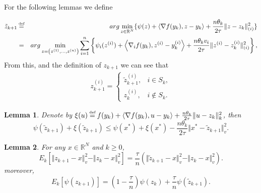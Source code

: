 \documentclass{article}
\newcommand\myeq{\stackrel{\mathclap{\normalfont\mbox{\tiny{def}}}}{=}}
\newcommand{\R}{\mathbb{R}}
\newcommand{\x}{x^*}
\newtheorem{lema}{Lemma}
\begin{document}
For the following lemmas we define

\begin{eqnarray*}
	\tilde{z}_{k+1} &\myeq & arg \min_{z \in \R^N} \lbrace \psi(z) + \left< \nabla f(y_k),z-y_k\right> + \frac{n\theta_k}{2\tau} \Vert z-z_k \Vert_{(i)}^2 \rbrace \\
	&=&arg\min_{z = \left(z^{(1)},\ldots,z^{(n)} \right)} \sum_{i=1}^n \left\lbrace \psi_i(z^{(i)}) + \left< \nabla_i f(y_k),z^{(i)}-y_k^{(i)} \right> + \frac{n\theta_k v_i}{2\tau} \Vert z^{(i)}-z_k^{(i)}\Vert_{(i)}^2 \right\rbrace,
\end{eqnarray*}
From this, and the definition of $z_{k+1}$ we can see that
\begin{align*}
	z_{k+1}^{(i)} = \begin{cases}
						\tilde{z}_{k+1}^{(i)}, &i \in S_k, \\
						z_k^{(i)}, &i \notin S_k. 
	\end{cases}
\end{align*}

\begin{lema}
Denote by $\xi(u) \myeq f(y_k) + \left< \nabla f(y_k),u-y_k \right> + \frac{n\theta_k}{2\tau}\Vert u-z_k \Vert^2_k$, then
	\begin{equation}
		\psi(\tilde{z}_{k+1}) + \xi(\tilde{z}_{k+1}) \leq \psi(\x)+\xi(\x)-\frac{n\theta_k}{2\tau} \Vert \x - \tilde{z}_{k+1} \Vert_v^2.
	\end{equation}
\label{lema_3}
\end{lema}

\begin{lema}
For any $x \in \R^N$ and $k\geq 0$,
	\begin{equation}
		E_k \left[ \Vert z_{k+1}-x \Vert_v^2 - \Vert z_k - x \Vert_v^2 \right] = \frac{\tau}{n} \left( \Vert \tilde{z}_{k+1} -x \Vert_v^2  - \Vert z_k - x  \Vert_v^2\right).
	\end{equation}
moreover,
	\begin{equation}
		E_k \left[ \psi(z_{k+1}) \right] = \left(1 - \frac{\tau}{n} \right) \psi(z_k) + \frac{\tau}{n} \psi(\tilde{z}_{k+1}).
	\end{equation}
\label{lema_4}
\end{lema}
\end{document}
